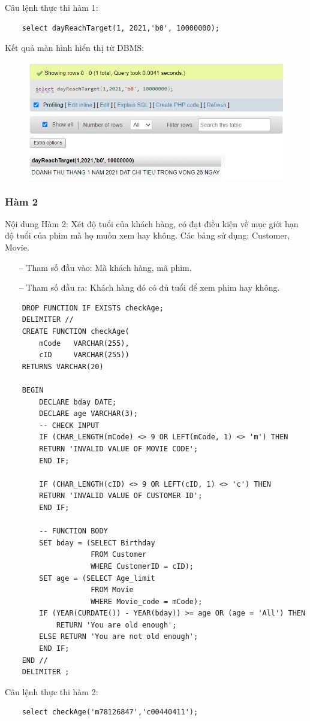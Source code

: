 Câu lệnh thực thi hàm 1:
\begin{verbatim}
    select dayReachTarget(1, 2021,'b0', 10000000);
\end{verbatim}
Kết quả màn hình hiển thị từ DBMS:
\begin{figure}[h]
    \centering
    \includegraphics{images/dayReachTarget.png}
\end{figure}
 \subsubsection{Hàm 2}
Nội dung Hàm 2: Xét độ tuổi của khách hàng, có đạt điều kiện về mục giới hạn độ tuổi của phim mà họ muốn xem hay không.
Các bảng sử dụng: Customer, Movie.
\begin{itemize}
    \item[--] Tham số đầu vào: Mã khách hàng, mã phim.
    \item[--] Tham số đầu ra: Khách hàng đó có đủ tuổi để xem phim hay không.
\end{itemize}
\begin{verbatim}
    DROP FUNCTION IF EXISTS checkAge;
    DELIMITER //
    CREATE FUNCTION checkAge(
        mCode   VARCHAR(255), 
        cID     VARCHAR(255))
    RETURNS VARCHAR(20)

    BEGIN
        DECLARE bday DATE;
        DECLARE age VARCHAR(3);
        -- CHECK INPUT
        IF (CHAR_LENGTH(mCode) <> 9 OR LEFT(mCode, 1) <> 'm') THEN
        RETURN 'INVALID VALUE OF MOVIE CODE';
        END IF;
    
        IF (CHAR_LENGTH(cID) <> 9 OR LEFT(cID, 1) <> 'c') THEN
        RETURN 'INVALID VALUE OF CUSTOMER ID';
        END IF;
    
        -- FUNCTION BODY
        SET bday = (SELECT Birthday
                    FROM Customer
                    WHERE CustomerID = cID);
        SET age = (SELECT Age_limit
                    FROM Movie
                    WHERE Movie_code = mCode);
        IF (YEAR(CURDATE()) - YEAR(bday)) >= age OR (age = 'All') THEN
            RETURN 'You are old enough';
        ELSE RETURN 'You are not old enough';
        END IF;
    END //
    DELIMITER ;
\end{verbatim}   
Câu lệnh thực thi hàm 2:
\begin{verbatim}
    select checkAge('m78126847','c00440411');
\end{verbatim}

